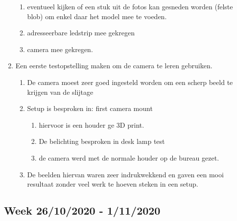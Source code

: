 \documentclass{article}
\begin{document}
\begin{enumerate}[1]
\begin{enumerate}[a]
	\item eventueel kijken of een stuk uit de fotos kan gesneden worden (felste blob) om enkel daar het model mee te voeden.
	\item adresseerbare ledstrip mee gekregen
	\item camera mee gekregen.
	\end{enumerate}
\item Een eerste testopstelling maken om de camera te leren gebruiken.
	\begin{enumerate}[a]
	\item De camera moest zeer goed ingesteld worden om een scherp beeld te krijgen van de slijtage
	\item Setup is besproken in: first camera mount
		\begin{enumerate}[1]
		\item hiervoor is een houder ge 3D print.
		\item De belichting besproken in desk lamp test
		\item de camera werd met de normale houder op de bureau gezet. 
		\end{enumerate}
	\item De beelden hiervan waren zeer indrukwekkend en gaven een mooi resultaat zonder veel werk te hoeven steken in een setup.
	\end{enumerate}
\end{enumerate}


\subsection{Week 26/10/2020 - 1/11/2020}
\end{document}

